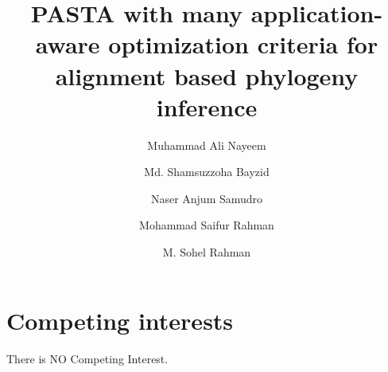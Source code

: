 \documentclass[unnumsec,webpdf,modern,large]{oup-authoring-template}
\theoremstyle{thmstyleone}%
\theoremstyle{thmstyletwo}%
\theoremstyle{thmstylethree}%
\begin{document}
\DOI{}
\copyrightyear{}
\pubyear{}
\access{}



\title[PASTA with many application-aware optimization criteria]{PASTA with many application-aware optimization criteria for alignment based phylogeny inference}

\author[1]{Muhammad Ali Nayeem}
\author[1]{Md. Shamsuzzoha Bayzid}
\author[1]{Naser Anjum Samudro}
\author[1]{Mohammad Saifur Rahman}
\author[1,$\ast$]{M. Sohel Rahman}


\address[1]{, , }









\maketitle

 




%
\section{Competing interests}
There is NO Competing Interest.
\end{document}

